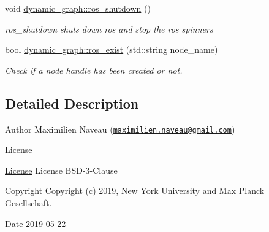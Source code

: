 \begin{DoxyCompactItemize}
void \hyperlink{namespacedynamic__graph_a7d2045abc7e02fe4ee746c5cbb937b04}{dynamic\+\_\+graph\+::ros\+\_\+shutdown} ()
\begin{DoxyCompactList}\small\item\em ros\+\_\+shutdown shuts down ros and stop the ros spinners \end{DoxyCompactList}\item 
\mbox{\label{namespacedynamic__graph_ab000cd6e1e6ed365a5a3e1adddf89dff}} 
bool \hyperlink{namespacedynamic__graph_ab000cd6e1e6ed365a5a3e1adddf89dff}{dynamic\+\_\+graph\+::ros\+\_\+exist} (std\+::string node\+\_\+name)
\begin{DoxyCompactList}\small\item\em Check if a node handle has been created or not. \end{DoxyCompactList}\end{DoxyCompactItemize}


\subsection{Detailed Description}
\begin{DoxyAuthor}{Author}
Maximilien Naveau (\href{mailto:maximilien.naveau@gmail.com}{\tt maximilien.\+naveau@gmail.\+com}) 
\end{DoxyAuthor}
\begin{DoxyRefDesc}{License}
\item[\hyperlink{license__license000015}{License}]License B\+S\+D-\/3-\/\+Clause \end{DoxyRefDesc}
\begin{DoxyCopyright}{Copyright}
Copyright (c) 2019, New York University and Max Planck Gesellschaft. 
\end{DoxyCopyright}
\begin{DoxyDate}{Date}
2019-\/05-\/22 
\end{DoxyDate}

